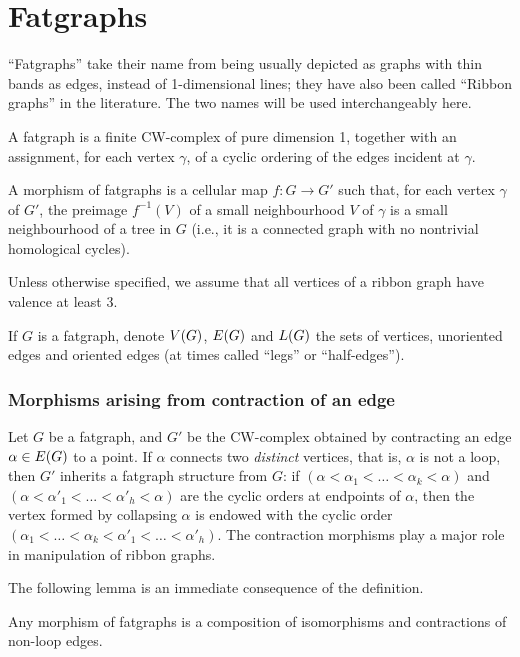 \section{Fatgraphs}
\label{sec:fatgraphs}

``Fatgraphs'' take their name from being usually depicted as graphs
with thin bands as edges, instead of 1-dimensional lines; they have
also been called ``Ribbon graphs'' in the literature.  The two names
will be used interchangeably here.

\begin{definition}
  \label{dfn:fatgraphs}
  A fatgraph is a finite CW-complex of pure dimension 1, together
  with an assignment, for each vertex $\gamma$, of a cyclic ordering of the
  edges incident at $\gamma$.

  A morphism of fatgraphs is a cellular map $f:G\to G'$ such that,
  for each vertex $\gamma$ of $G'$, the preimage $f^{-1}(V)$ of a small
  neighbourhood $V$ of $\gamma$ is a small neighbourhood of a tree in $G$
  (i.e., it is a connected graph with no nontrivial homological
  cycles).
\end{definition}
Unless otherwise specified, we assume that all vertices of a ribbon
graph have valence at least 3.

If $G$ is a fatgraph, denote $V(G)$, $E(G)$ and
$L(G)$ the sets of vertices, unoriented edges and oriented edges
(at times called ``legs'' or ``half-edges'').

\subsubsection{Morphisms arising from contraction of an edge}
\label{sec:contractions}
Let $G$ be a fatgraph, and $G'$ be the CW-complex obtained by
contracting an edge $\alpha \in E(G)$ to a point.  If $\alpha$ connects two
\emph{distinct} vertices, that is, $\alpha$ is not a loop, then $G'$
inherits a fatgraph structure from $G$: if $(\alpha < \alpha_1 < \ldots < \alpha_k <
\alpha)$ and $(\alpha < \alpha'_1 < ... < \alpha'_h < \alpha)$ are the cyclic orders at
endpoints of $\alpha$, then the vertex formed by collapsing $\alpha$ is endowed
with the cyclic order $(\alpha_1 < \ldots < \alpha_k < \alpha'_1 < \ldots < \alpha'_h)$.  The
contraction morphisms play a major role in manipulation of ribbon
graphs.

The following lemma is an immediate consequence of the definition.
\begin{lemma}\label{lemma:contraction1}
  Any morphism of fatgraphs is a composition of isomorphisms and
  contractions of non-loop edges.
\end{lemma}

